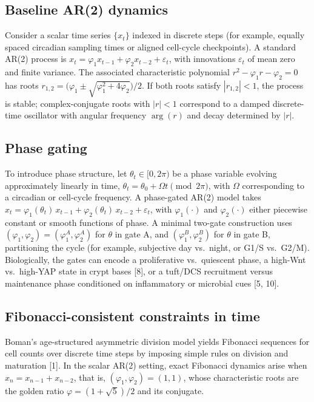 \documentclass[]{interact}
\begin{document}
\subsection{Baseline AR(2) dynamics}

Consider a scalar time series $\{x_t\}$ indexed in discrete steps
(for example, equally spaced circadian sampling times or aligned cell-cycle
checkpoints).
A standard AR(2) process is
$x_t = \varphi_1 x_{t-1} + \varphi_2 x_{t-2} + \varepsilon_t$,
with innovations $\varepsilon_t$ of mean zero and finite variance.
The associated characteristic polynomial
$r^2 - \varphi_1 r - \varphi_2 = 0$
has roots
$r_{1,2} = \bigl(\varphi_1 \pm \sqrt{\varphi_1^2 + 4\varphi_2}\bigr)/2$.
If both roots satisfy $|r_{1,2}| < 1$, the process is stable;
complex-conjugate roots with $|r| < 1$ correspond to a damped discrete-time
oscillator with angular frequency $\arg(r)$ and decay determined by $|r|$.

\subsection{Phase gating}

To introduce phase structure, let $\theta_t \in [0, 2\pi)$ be a phase variable
evolving approximately linearly in time,
$\theta_t = \theta_0 + \Omega t \pmod{2\pi}$,
with $\Omega$ corresponding to a circadian or cell-cycle frequency.
A phase-gated AR(2) model takes
$x_t = \varphi_1(\theta_t)\,x_{t-1} + \varphi_2(\theta_t)\,x_{t-2}
+ \varepsilon_t$,
with $\varphi_1(\cdot)$ and $\varphi_2(\cdot)$ either piecewise constant or
smooth functions of phase.
A minimal two-gate construction uses
$(\varphi_1, \varphi_2) = (\varphi_1^A, \varphi_2^A)$ for $\theta$ in gate A,
and $(\varphi_1^B, \varphi_2^B)$ for $\theta$ in gate B, partitioning the
cycle (for example, subjective day vs.\ night, or G1/S vs.\ G2/M).
Biologically, the gates can encode a proliferative vs.\ quiescent phase, a
high-Wnt vs.\ high-YAP state in crypt bases [8], or a tuft/DCS recruitment
versus maintenance phase conditioned on inflammatory or microbial cues [5, 10].

\subsection{Fibonacci-consistent constraints in time}

Boman's age-structured asymmetric division model yields Fibonacci sequences for
cell counts over discrete time steps by imposing simple rules on division and
maturation [1].
In the scalar AR(2) setting, exact Fibonacci dynamics arise when
$x_n = x_{n-1} + x_{n-2}$, that is, $(\varphi_1, \varphi_2) = (1, 1)$,
whose characteristic roots are the golden ratio $\varphi = (1+\sqrt{5})/2$ and
its conjugate.
\end{document}
